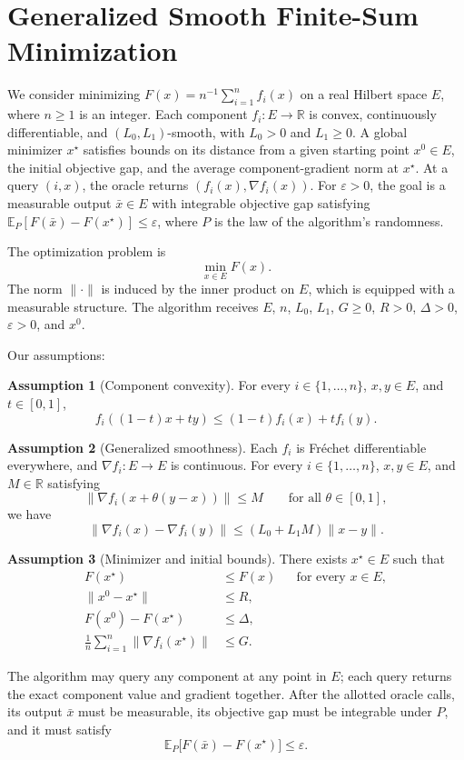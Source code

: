 \documentclass[10pt]{article}
\theoremstyle{definition}
\newtheorem{assumption}{Assumption}
\begin{document}
\section*{Generalized Smooth Finite-Sum Minimization}
We consider minimizing $F(x)=n^{-1}\sum_{i=1}^n f_i(x)$ on a real Hilbert space $E$, where $n\geq1$ is an integer. Each component $f_i:E\to\mathbb{R}$ is convex, continuously differentiable, and $(L_0,L_1)$-smooth, with $L_0>0$ and $L_1\geq0$. A global minimizer $x^\star$ satisfies bounds on its distance from a given starting point $x^0\in E$, the initial objective gap, and the average component-gradient norm at $x^\star$. At a query $(i,x)$, the oracle returns $(f_i(x),\nabla f_i(x))$. For $\varepsilon>0$, the goal is a measurable output $\bar{x}\in E$ with integrable objective gap satisfying $\mathbb{E}_{P}[F(\bar{x})-F(x^\star)]\leq\varepsilon$, where $P$ is the law of the algorithm's randomness.

The optimization problem is
\[
\min_{x\in E} F(x).
\]
The norm $\|\cdot\|$ is induced by the inner product on $E$, which is equipped with a measurable structure. The algorithm receives $E$, $n$, $L_0$, $L_1$, $G\geq0$, $R>0$, $\Delta>0$, $\varepsilon>0$, and $x^0$.

Our assumptions:
\begin{assumption}[Component convexity]
For every $i\in\{1,\ldots,n\}$, $x,y\in E$, and $t\in[0,1]$,
\[
f_i((1-t)x+ty)\leq (1-t)f_i(x)+t f_i(y).
\]
\end{assumption}

\begin{assumption}[Generalized smoothness]
Each $f_i$ is Fr\'echet differentiable everywhere, and $\nabla f_i:E\to E$ is continuous. For every $i\in\{1,\ldots,n\}$, $x,y\in E$, and $M\in\mathbb{R}$ satisfying
\[
\|\nabla f_i(x+\theta(y-x))\|\leq M
\qquad\text{for all }\theta\in[0,1],
\]
we have
\[
\|\nabla f_i(x)-\nabla f_i(y)\|
\leq (L_0+L_1M)\|x-y\|.
\]
\end{assumption}

\begin{assumption}[Minimizer and initial bounds]
There exists $x^\star\in E$ such that
\[
\begin{aligned}
F(x^\star)&\leq F(x) &&\text{for every }x\in E,\\
\|x^0-x^\star\|&\leq R,\\
F(x^0)-F(x^\star)&\leq\Delta,\\
\frac{1}{n}\sum_{i=1}^n\|\nabla f_i(x^\star)\|&\leq G.
\end{aligned}
\]
\end{assumption}

The algorithm may query any component at any point in $E$; each query returns the exact component value and gradient together. After the allotted oracle calls, its output $\bar{x}$ must be measurable, its objective gap must be integrable under $P$, and it must satisfy
\[
\mathbb{E}_{P}\bigl[F(\bar{x})-F(x^\star)\bigr]\leq\varepsilon.
\]
\end{document}

